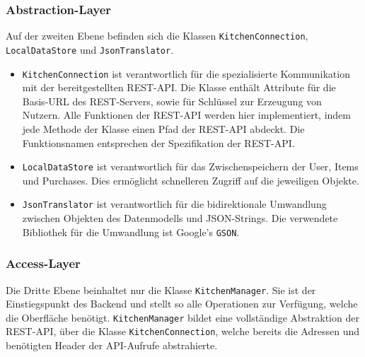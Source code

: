 \documentclass{scrartcl}
\begin{document}
	\subsubsection{Abstraction-Layer}

	Auf der zweiten Ebene befinden sich die Klassen \texttt{KitchenConnection}, \texttt{LocalDataStore} und \texttt{JsonTranslator}.

	\begin{itemize}
		\item  \texttt{KitchenConnection} ist verantwortlich für die spezialisierte Kommunikation mit der bereitgestellten REST-API. Die Klasse enthält Attribute für die Basis-URL des REST-Servers, sowie für Schlüssel zur Erzeugung von Nutzern.
		Alle Funktionen der REST-API werden hier implementiert, indem jede Methode der Klasse einen Pfad der REST-API abdeckt.
		Die Funktionsnamen entsprechen der Spezifikation der REST-API\@.

		\item \texttt{LocalDataStore} ist verantwortlich für das Zwischenspeichern der User, Items und Purchases.
		Dies ermöglicht schnelleren Zugriff auf die jeweiligen Objekte.

		\item \texttt{JsonTranslator} ist verantwortlich für die bidirektionale Umwandlung zwischen Objekten des Datenmodells und JSON-Strings.
		Die verwendete Bibliothek für die Umwandlung ist Google's \texttt{GSON}.
	\end{itemize}

	\subsubsection{Access-Layer}

	Die Dritte Ebene beinhaltet nur die Klasse \texttt{KitchenManager}.
	Sie ist der Einstiegspunkt des Backend und stellt so alle Operationen zur Verfügung, welche die Oberfläche benötigt. \texttt{KitchenManager} bildet eine vollständige Abstraktion der REST-API, über die Klasse \texttt{KitchenConnection}, welche bereits die Adressen und benötigten Header der API-Aufrufe abstrahierte.
\end{document}
